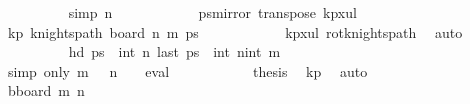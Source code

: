 \begin{isabellebody}
\isanewline
\ \ \ \ \ \ \ \ \isamarkupfalse%
\ {\isacharbrackleft}{\kern0pt}simp{\isacharbrackright}{\kern0pt}{\isacharcolon}{\kern0pt}\ {\isachardoublequoteopen}n\ {\isacharequal}{\kern0pt}\ {}{\isachardoublequoteclose}\isanewline
\ \ \ \ \ \ \ \ \isamarkupfalse%
\ {\isacharquery}{\kern0pt}ps{\isacharequal}{\kern0pt}{\isachardoublequoteopen}mirror{}\ {\isacharparenleft}{\kern0pt}transpose\ kp{}x{}ul{\isacharparenright}{\kern0pt}{\isachardoublequoteclose}\isanewline
\ \ \ \ \ \ \ \ \isamarkupfalse%
\ kp{\isacharcolon}{\kern0pt}\ {\isachardoublequoteopen}knights{\isacharunderscore}{\kern0pt}path\ {\isacharparenleft}{\kern0pt}board\ n\ m{\isacharparenright}{\kern0pt}\ {\isacharquery}{\kern0pt}ps{\isachardoublequoteclose}\isanewline
\ \ \ \ \ \ \ \ \ \ \isamarkupfalse%
\ kp{\isacharunderscore}{\kern0pt}{}x{}{\isacharunderscore}{\kern0pt}ul\ rot{}{}{\isacharunderscore}{\kern0pt}knights{\isacharunderscore}{\kern0pt}path\ \isamarkupfalse%
\ auto\isanewline
\ \ \ \ \ \ \ \ \isamarkupfalse%
\ {\isachardoublequoteopen}hd\ {\isacharquery}{\kern0pt}ps\ {\isacharequal}{\kern0pt}\ {\isacharparenleft}{\kern0pt}int\ n{\isacharcomma}{\kern0pt}{}{\isacharparenright}{\kern0pt}{\isachardoublequoteclose}\ {\isachardoublequoteopen}last\ {\isacharquery}{\kern0pt}ps\ {\isacharequal}{\kern0pt}\ {\isacharparenleft}{\kern0pt}int\ n{\isacharminus}{\kern0pt}{}{\isacharcomma}{\kern0pt}int\ m{\isacharminus}{\kern0pt}{}{\isacharparenright}{\kern0pt}{\isachardoublequoteclose}\isanewline
\ \ \ \ \ \ \ \ \ \ \isamarkupfalse%
\ {\isacharparenleft}{\kern0pt}simp\ only{\isacharcolon}{\kern0pt}\ {\isacartoucheopen}m\ {\isacharequal}{\kern0pt}\ {}{\isacartoucheclose}\ {\isacartoucheopen}n\ {\isacharequal}{\kern0pt}\ {}{\isacartoucheclose}\ {\isacharbar}{\kern0pt}\ eval{\isacharparenright}{\kern0pt}{\isacharplus}{\kern0pt}\isanewline
\ \ \ \ \ \ \ \ \isamarkupfalse%
\ \isamarkupfalse%
\ {\isacharquery}{\kern0pt}thesis\ \isamarkupfalse%
\ kp\ \isamarkupfalse%
\ auto\isanewline
\ \ \ \ \ \ \isamarkupfalse%
\isanewline
\ \ \ \ \ \ \ \ \isamarkupfalse%
\ {\isacharquery}{\kern0pt}bboard\ m\ {\isacharparenleft}{\kern0pt}n{\isacharminus}{\kern0pt}{}{\isacharparenright}{\kern0pt}{\isachardoublequoteclose}\isanewline

\end{isabellebody}
